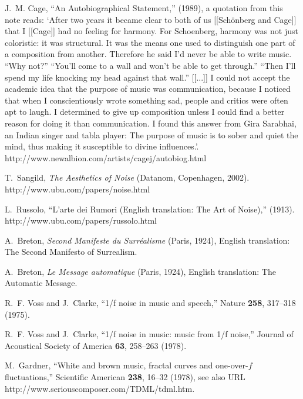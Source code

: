 \documentclass[rmp,amssymb,showpacs,showkeys,12pt,preprint]{revtex4}
\begin{document}
\begin{thebibliography}{10}
J.~M. Cage, \enquote{An Autobiographical Statement,}  (1989), a quotation from
  this note reads: `After two years it became clear to both of us [[Sch\"onberg
  and Cage]] that I [[Cage]] had no feeling for harmony. For Schoenberg,
  harmony was not just coloristic: it was structural. It was the means one used
  to distinguish one part of a composition from another. Therefore he said I'd
  never be able to write music. ``Why not?'' ``You'll come to a wall and won't
  be able to get through.'' ``Then I'll spend my life knocking my head against
  that wall.'' [[...]] I could not accept the academic idea that the purpose of
  music was communication, because I noticed that when I conscientiously wrote
  something sad, people and critics were often apt to laugh. I determined to
  give up composition unless I could find a better reason for doing it than
  communication. I found this answer from Gira Sarabhai, an Indian singer and
  tabla player: The purpose of music is to sober and quiet the mind, thus
  making it susceptible to divine influences.'.
\newline http://www.newalbion.com/artists/cagej/autobiog.html

T.~Sangild, {\em The Aesthetics of Noise\/} (Datanom, Copenhagen, 2002).
\newline http://www.ubu.com/papers/noise.html

L.~Russolo, \enquote{L'arte dei Rumori ({E}nglish translation: The Art of
  Noise),}  (1913).
\newline http://www.ubu.com/papers/russolo.html

A.~Breton, {\em Second Manifeste du Surr{\'{e}}alisme\/} (Paris, 1924),
  {E}nglish translation: The Second Manifesto of Surrealism.

A.~Breton, {\em Le Message automatique\/} (Paris, 1924), {E}nglish translation:
  The Automatic Message.

R.~F. Voss and J.~Clarke, \enquote{1/f noise in music and speech,} Nature {\bf
  258}, 317--318 (1975).

R.~F. Voss and J.~Clarke, \enquote{1/f noise in music: music from 1/f noise,}
  Journal of Acoustical Society of America {\bf 63}, 258--263 (1978).

M.~Gardner, \enquote{White and brown music, fractal curves and one-over-$f$
  fluctuations,} Scientific American {\bf 238}, 16--32 (1978), see also URL
  http://www.seriouscomposer.com/TDML/tdml.htm.


\end{thebibliography}
\end{document}
